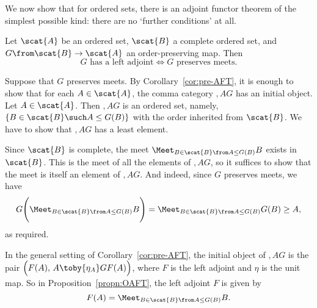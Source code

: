 We now show that for ordered sets, there is an adjoint functor theorem of the
simplest possible kind: there are no `further conditions' at all.

\begin{propn}
\label{propn:OAFT}
Let $\scat{A}$ be an ordered set, $\scat{B}$ a complete ordered set, and
$G\from \scat{B} \to \scat{A}$ an order-preserving map.  Then
\[
G \text{ has a left adjoint}
\iff
G \text{ preserves meets}.
\]
\end{propn}

\begin{pf}
Suppose that $G$ preserves meets.  By Corollary~\ref{cor:pre-AFT}, it is
enough to show that for each $A \in \scat{A}$, the comma category
$\comma{A}{G}$ has an initial object.  Let $A \in \scat{A}$.  Then
$\comma{A}{G}$ is an ordered set, namely, $\{ B \in \scat{B} \such A \leq
G(B) \}$ with the order inherited from $\scat{B}$.  We have to show that
$\comma{A}{G}$ has a least element.

Since $\scat{B}$ is complete, the meet $\Meet_{B \in \scat{B}\from A \leq
  G(B)} B$ exists in $\scat{B}$.  This is the meet of all the elements of
$\comma{A}{G}$, so it suffices to show that the meet is itself an element
of $\comma{A}{G}$.  And indeed, since $G$ preserves meets, we have
\[
G \Biggl( \Meet_{B \in \scat{B}\from A \leq G(B)} B \Biggr)
=
\Meet_{B \in \scat{B}\from A \leq G(B)} G(B)
\geq
A,
\]
as required.
\end{pf}

In the general setting of Corollary~\ref{cor:pre-AFT}, the initial object
of $\comma{A}{G}$ is the pair $\Bigl(F(A),\, A \toby{\eta_A} GF(A)\Bigr)$,
where $F$ is the left adjoint and $\eta$ is the unit map.  So in
Proposition~\ref{propn:OAFT}, the left adjoint $F$ is given by
% 
\begin{equation}        
\label{eq:ladj-recipe}
F(A) 
= 
\Meet_{B \in \scat{B}\from A \leq G(B)} B.
\end{equation}

